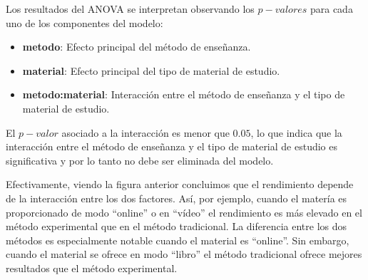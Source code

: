 \documentclass[
  letterpaper,
  DIV=11,
  numbers=noendperiod]{scrreprt}
\providecommand{\tightlist}{%
  \setlength{\itemsep}{0pt}\setlength{\parskip}{0pt}}\usepackage{longtable,booktabs,array}
\begin{document}
\begin{tcolorbox}
Los resultados del ANOVA se interpretan observando los \(p-valores\)
para cada uno de los componentes del modelo:

\begin{itemize}
\tightlist
\item
  \textbf{metodo}: Efecto principal del método de enseñanza.
\item
  \textbf{material}: Efecto principal del tipo de material de estudio.
\item
  \textbf{metodo:material}: Interacción entre el método de enseñanza y
  el tipo de material de estudio.
\end{itemize}

El \(p-valor\) asociado a la interacción es menor que \(0.05\), lo que
indica que la interacción entre el método de enseñanza y el tipo de
material de estudio es significativa y por lo tanto no debe ser
eliminada del modelo.

Efectivamente, viendo la figura anterior concluimos que el rendimiento
depende de la interacción entre los dos factores. Así, por ejemplo,
cuando el matería es proporcionado de modo ``online'' o en ``vídeo'' el
rendimiento es más elevado en el método experimental que en el método
tradicional. La diferencia entre los dos métodos es especialmente
notable cuando el material es ``online''. Sin embargo, cuando el
material se ofrece en modo ``libro'' el método tradicional ofrece
mejores resultados que el método experimental.

\end{tcolorbox}
\end{document}
